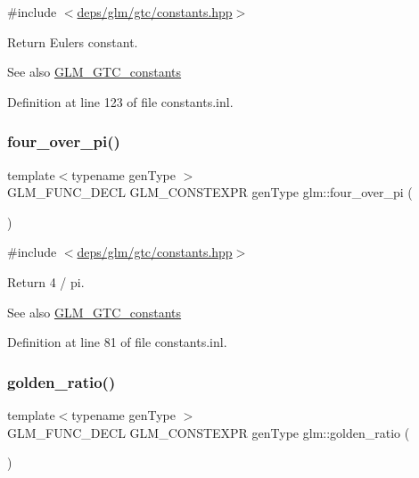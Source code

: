 {\ttfamily \#include $<$\hyperlink{constants_8hpp}{deps/glm/gtc/constants.\+hpp}$>$}

Return Euler\textquotesingle{}s constant. \begin{DoxySeeAlso}{See also}
\hyperlink{group__gtc__constants}{G\+L\+M\+\_\+\+G\+T\+C\+\_\+constants} 
\end{DoxySeeAlso}


Definition at line 123 of file constants.\+inl.

\mbox{\label{group__gtc__constants_ga753950e5140e4ea6a88e4a18ba61dc09}} 
\subsubsection{\texorpdfstring{four\+\_\+over\+\_\+pi()}{four\_over\_pi()}}
{\footnotesize\ttfamily template$<$typename gen\+Type $>$ \\
G\+L\+M\+\_\+\+F\+U\+N\+C\+\_\+\+D\+E\+CL G\+L\+M\+\_\+\+C\+O\+N\+S\+T\+E\+X\+PR gen\+Type glm\+::four\+\_\+over\+\_\+pi (\begin{DoxyParamCaption}{ }\end{DoxyParamCaption})}



{\ttfamily \#include $<$\hyperlink{constants_8hpp}{deps/glm/gtc/constants.\+hpp}$>$}

Return 4 / pi. \begin{DoxySeeAlso}{See also}
\hyperlink{group__gtc__constants}{G\+L\+M\+\_\+\+G\+T\+C\+\_\+constants} 
\end{DoxySeeAlso}


Definition at line 81 of file constants.\+inl.

\mbox{\label{group__gtc__constants_ga748cf8642830657c5b7eae04d0a80899}} 
\subsubsection{\texorpdfstring{golden\+\_\+ratio()}{golden\_ratio()}}
{\footnotesize\ttfamily template$<$typename gen\+Type $>$ \\
G\+L\+M\+\_\+\+F\+U\+N\+C\+\_\+\+D\+E\+CL G\+L\+M\+\_\+\+C\+O\+N\+S\+T\+E\+X\+PR gen\+Type glm\+::golden\+\_\+ratio (\begin{DoxyParamCaption}{ }\end{DoxyParamCaption})}



